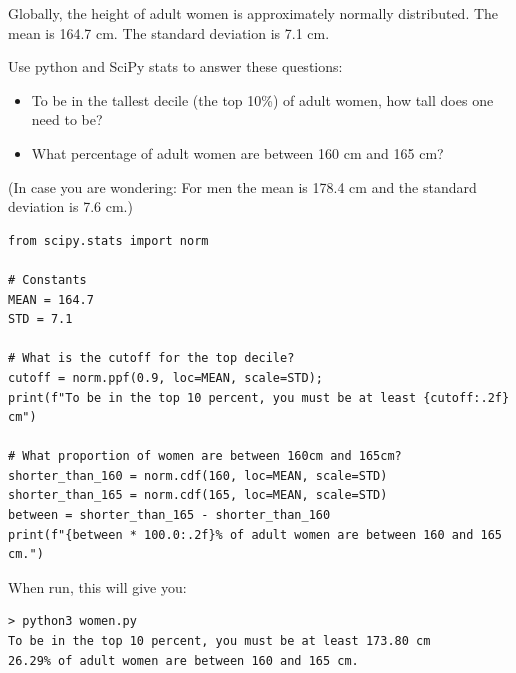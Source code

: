 \begin{Exercise}[title={SciPy Stats}, label=scipy_ppf]

Globally,  the height of adult women is approximately normally distributed.  The mean is 164.7 cm.  The standard deviation is 7.1 cm.

Use python and SciPy stats to answer these questions: 

\begin{itemize}
\item To be in the tallest decile (the top 10\%) of adult women,  how tall does one need to be? 

\item What percentage of adult women are between 160 cm and 165 cm?

\end{itemize}

(In case you are wondering: For men the mean is 178.4 cm and the standard deviation is 7.6 cm.)

\end{Exercise}
\begin{Answer}[ref=scipy_ppf]

\begin{verbatim}
from scipy.stats import norm

# Constants
MEAN = 164.7 
STD = 7.1

# What is the cutoff for the top decile?
cutoff = norm.ppf(0.9, loc=MEAN, scale=STD);
print(f"To be in the top 10 percent, you must be at least {cutoff:.2f} cm")

# What proportion of women are between 160cm and 165cm?
shorter_than_160 = norm.cdf(160, loc=MEAN, scale=STD)
shorter_than_165 = norm.cdf(165, loc=MEAN, scale=STD)
between = shorter_than_165 - shorter_than_160
print(f"{between * 100.0:.2f}% of adult women are between 160 and 165 cm.")
\end{verbatim}

When run,  this will give you:

\begin{verbatim}
> python3 women.py
To be in the top 10 percent, you must be at least 173.80 cm
26.29% of adult women are between 160 and 165 cm.
\end{verbatim}

\end{Answer}
